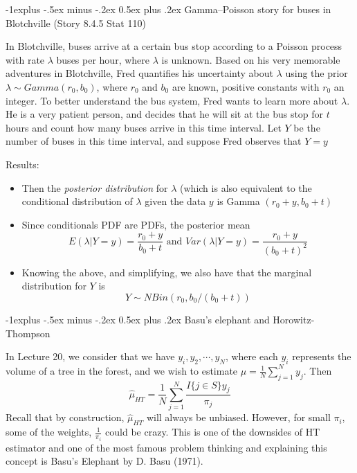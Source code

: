 \documentclass[10pt,landscape]{article}
\makeatletter
\renewcommand{\subsection}{\@startsection{subsection}{2}{0mm}%
                                {-1explus -.5ex minus -.2ex}%
                                {0.5ex plus .2ex}%
                                {\normalfont\normalsize\bfseries}}
\makeatother
\begin{document}
\begin{multicols*}{3}
\subsection{Gamma–Poisson
story for buses in Blotchville (Story 8.4.5 Stat 110)}

In Blotchville, buses arrive at a certain
bus stop according to a Poisson process with rate $\lambda$  buses per hour, where $\lambda$  is
unknown. Based on his very memorable adventures in Blotchville, Fred quantifies
his uncertainty about $\lambda$  using the prior $\lambda \sim Gamma(r_0, b_0)$, where $r_0$ and $b_0$ are known, positive constants with $r_0$ an integer. To better understand the bus system, Fred wants to learn more about $\lambda$. He is a
very patient person, and decides that he will sit at the bus stop for $t$ hours and count how many buses arrive in this time interval. Let $Y$ be the number of buses in
this time interval, and suppose Fred observes that $Y = y$

Results:
\begin{itemize}
    \item Then the \textit{posterior distribution} for $\lambda$ (which is also equivalent to the conditional distribution of $\lambda$ given the data $y$ is Gamma $(r_0+y,b_0+t)$
    \item Since conditionals PDF are PDFs, the posterior mean $$E(\lambda|Y=y) = \frac{r_0+y}{b_0+t} \text{ and } Var(\lambda|Y=y)=\frac{r_0+y}{(b_0+t)^2}$$
    \item Knowing the above, and simplifying, we also have that the marginal distribution for $Y$ is $$Y \sim NBin(r_0, b_0/(b_0+t))$$
\end{itemize}


\subsection{Basu's elephant and Horowitz-Thompson}

In Lecture 20, we consider that we have $y_i, y_2, \cdots, y_N$, where each $y_i$ represents the volume of a tree in the forest, and we wish to estimate $\mu=\frac{1}{N}\sum_{j=1}^N y_j$. Then $$\hat{\mu}_{HT} =\frac{1}{N} \sum_{j=1}^N \frac{I\{j \in S\}y_j}{\pi_j}$$
Recall that by construction, $\hat{\mu}_{HT}$ will always be unbiased. However, for small $\pi_i$, some of the weights, $\frac{1}{\pi_i}$ could be crazy. This is one of the downsides of HT estimator and one of the most famous problem thinking and explaining this concept is Basu's Elephant by D. Basu (1971).




\end{multicols*}
\end{document}
